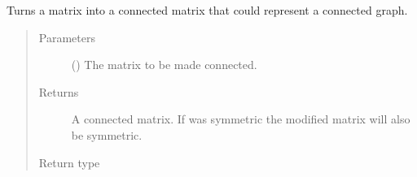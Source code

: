 \documentclass[letterpaper,10pt,english]{sphinxmanual}
\begin{document}
\begin{fulllineitems}
\label{\detokenize{app.domain.helpers:app.domain.helpers.matrices.make_connected}}
Turns a matrix into a connected matrix that could represent a
connected graph.
\begin{quote}\begin{description}
\item[{Parameters}] \leavevmode
{} () \textendash{} The matrix to be made connected.

\item[{Returns}] \leavevmode
A connected matrix. If  was symmetric the modified matrix will
also be symmetric.

\item[{Return type}] \leavevmode
{}

\end{description}\end{quote}

\end{fulllineitems}

\end{document}
